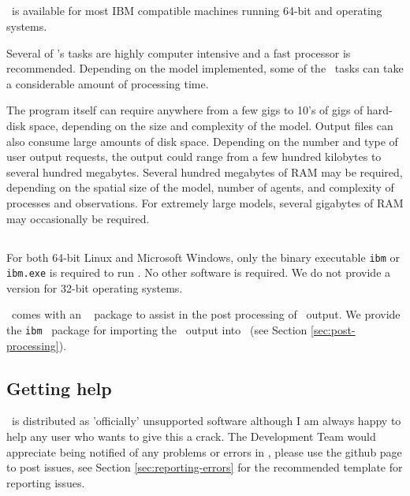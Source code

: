 \subsection{}
\IBM\ is available for most IBM compatible machines running 64-bit  and  operating systems.

Several of \IBM 's tasks are highly computer intensive and a fast processor is recommended. Depending on the model implemented, some of the \IBM\ tasks can take a considerable amount of processing time.

The program itself can require anywhere from a few gigs to 10's of gigs of hard-disk space, depending on the size and complexity of the model. Output files can also consume large amounts of disk space. Depending on the number and type of user output requests, the output could range from a few hundred kilobytes to several hundred megabytes. Several hundred megabytes of RAM may be required, depending on the spatial size of the model, number of agents, and complexity of processes and observations. For extremely large models, several gigabytes of RAM may occasionally be required. 

\subsection{}

For both 64-bit Linux and Microsoft Windows, only the binary executable \texttt{ibm} or \texttt{ibm.exe} is required to run \IBM . No other software is required. We do not provide a version for 32-bit operating systems. 

\IBM\ comes with an \href{http://www.r-project.org}{\R}\ \citep{R} package to assist in the post processing of \IBM\ output. We provide the \texttt{ibm} \R\ package for importing the \IBM\ output into \R\ (see Section \ref{sec:post-processing}).

\subsection{Getting help}

\IBM\ is distributed as 'officially' unsupported software although I am always happy to help any user who wants to give this a crack. The Development Team would appreciate being notified of any problems or errors in \IBM , please use the github page to post issues, see Section \ref{sec:reporting-errors} for the recommended template for reporting issues.

